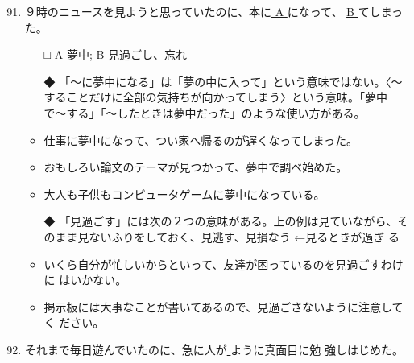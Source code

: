 \documentclass[
uplatex,
b5paper,
10pt,
dvipdfmx
]{jsbook}
\begin{document}
\begin{enumerate}
\setcounter{enumi}{90}

\item ９時のニュースを見ようと思っていたのに、本に\underline{ A }になって、
      \underline{ B }てしまった。

\begin{itemize}
\item[□] A 夢中; B 見過ごし、忘れ
\item[◆] 「〜に夢中になる」は「夢の中に入って」という意味ではない。〈〜
	  することだけに全部の気持ちが向かってしまう〉という意味。「夢中
	  で〜する」「〜したときは夢中だった」のような使い方がある。
\end{itemize}
\begin{itemize}
\item 仕事に夢中になって、つい家へ帰るのが遅くなってしまった。
\item おもしろい論文のテーマが見つかって、夢中で調べ始めた。
\item 大人も子供もコンピュータゲームに夢中になっている。
\end{itemize}
\begin{itemize}
\item[◆] 「見過ごす」には次の２つの意味がある。上の例は見ていながら、そ
	  のまま見ないふりをしておく、見逃す、見損なう ←見るときが過ぎ
	  る
\end{itemize}
\begin{itemize}
\item いくら自分が忙しいからといって、友達が困っているのを見過ごすわけに
      はいかない。
\item 掲示板には大事なことが書いてあるので、見過ごさないように注意してく
      ださい。
\end{itemize}


\item それまで毎日遊んでいたのに、急に人が\underline{     }ように真面目に勉
      強しはじめた。


\end{enumerate}
\end{document}
